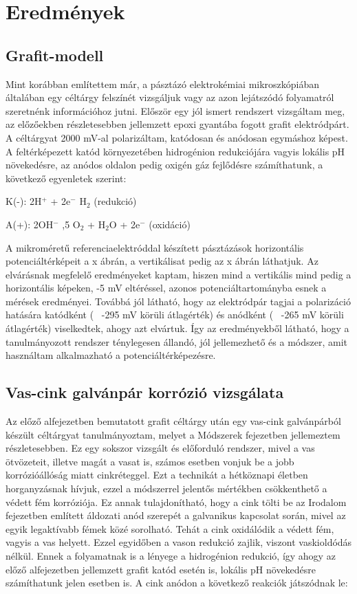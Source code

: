 \chapter{Eredmények}
\pagestyle{headings}


\section{Grafit-modell}

Mint korábban említettem már, a pásztázó elektrokémiai mikroszkópiában általában egy céltárgy felszínét vizsgáljuk vagy az azon lejátszódó folyamatról szeretnénk információhoz jutni. Először egy jól ismert rendszert vizsgáltam meg, az előzőekben részletesebben jellemzett epoxi gyantába fogott grafit elektródpárt. A céltárgyat 2000 mV-al polarizáltam, katódosan és anódosan egymáshoz képest. A feltérképezett katód környezetében hidrogénion redukciójára vagyis lokális pH növekedésre, az anódos oldalon pedig oxigén gáz fejlődésre számíthatunk, a következő egyenletek szerint:

K(-): 2H$^+$ + 2e$^-$ \longrightarrow H$_2$ (redukció)

A(+):  2OH$^-$ ,5 O$_2$ + H$_2$O + 2e$^-$ (oxidáció)

A mikroméretű referenciaelektróddal készített pásztázások horizontális potenciáltérképeit a x ábrán, a vertikálisat pedig az x ábrán láthatjuk. Az elvárásnak megfelelő eredményeket kaptam, hiszen mind a vertikális mind pedig a horizontális képeken, -5 mV eltéréssel, azonos potenciáltartományba esnek a mérések eredményei. Továbbá jól látható, hogy az elektródpár tagjai a polarizáció hatására katódként (~ -295 mV körüli átlagérték) és anódként (~ -265 mV körüli átlagérték) viselkedtek, ahogy azt elvártuk. Így az eredményekből látható, hogy a tanulmányozott rendszer ténylegesen állandó, jól jellemezhető és a módszer, amit használtam alkalmazható a potenciáltérképezésre. 

\section{Vas-cink galvánpár korrózió vizsgálata}

Az előző alfejezetben bemutatott grafit céltárgy után egy vas-cink galvánpárból készült céltárgyat tanulmányoztam, melyet a Módszerek fejezetben jellemeztem részletesebben. Ez egy sokszor vizsgált és előforduló rendszer, mivel a vas ötvözeteit, illetve magát a vasat is, számos esetben vonjuk be a jobb korrózióállóság miatt cinkréteggel. Ezt a technikát a hétköznapi életben horganyzásnak hívjuk, ezzel a módszerrel jelentős mértékben csökkenthető a védett fém korróziója. Ez annak tulajdonítható, hogy a cink tölti be az Irodalom fejezetben említett áldozati anód szerepét a galvanikus kapcsolat során, mivel az egyik legaktívabb fémek közé sorolható. Tehát a cink oxidálódik a védett fém, vagyis a vas helyett. Ezzel egyidőben a vason redukció zajlik, viszont vaskioldódás nélkül. Ennek a folyamatnak is a lényege a hidrogénion redukció, így ahogy az előző alfejezetben jellemzett grafit katód esetén is, lokális pH növekedésre számíthatunk jelen esetben is. A cink anódon a következő reakciók játszódnak le:


